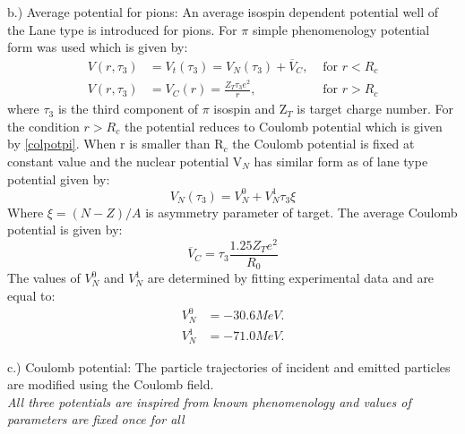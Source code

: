 \par
b.) Average potential for pions\cite{INCL_Aou_2006}:  An average isospin dependent potential well of the Lane type \cite{Lane1962PhysRevLett} is introduced for pions. For $\pi$ simple phenomenology potential form was used which is given by:
\begin{align}
	V\left(r,\tau_3\right)&=V_t(\tau_3)=V_N(\tau_3)+\overline{V}_C,& \text{ for } r<R_c \label{piopot}\\ 
	V\left(r,\tau_3\right)&=V_C(r)=\frac{Z_T\tau_3e^2}{r},& \text{ for } r>R_c 			\label{colpotpi}
\end{align}
where $\tau_3$ is the third component of $\pi$ isospin and Z$_T$ is target charge number. For the condition $r>R_c$  the potential reduces to Coulomb potential which is given by \eqref{colpotpi}. When r  is smaller than R$_c$ the Coulomb potential is fixed at constant value and the nuclear potential V$_N$ has similar form as of lane type potential given by:
\begin{equation}
	V_N(\tau_3)=V_N^{0}+V_N^{1}\tau_3\xi 
\end{equation}
Where $\xi=(N-Z)/A$ is asymmetry parameter of target. The average Coulomb potential is given by:
\begin{equation}
	\overline{V}_C =\tau_3\frac{1.25Z_T e^2}{R_0}
\end{equation}
The values of $V_N^{0}$ and $V_N^{1}$ are determined by fitting experimental data and are equal to:
\begin{align}
	V_N^{0}&=-30.6 MeV.\\
	V_N^{1}&=-71.0 MeV. 			
\end{align}\par
c.) Coulomb potential: The particle trajectories of incident and emitted particles are modified using the Coulomb field.\\
\textit{All three potentials are inspired from known phenomenology and values of parameters are fixed once for all}



